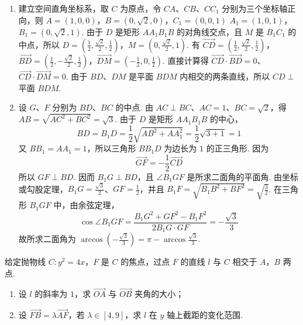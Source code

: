 \begin{solution}
\begin{enumerate}
\item 建立空间直角坐标系，取 \(C\) 为原点，令 \(CA\)、\(CB\)、\(CC_1\) 分别为三个坐标轴正向，则
\(A=(1,0,0)\)，\(B=(0,\sqrt2,0)\)，\(C_1=(0,0,1)\)
\(A_1=(1,0,1)\)，\(B_1=(0,\sqrt2,1)\).
由于 \(D\) 是矩形 \(AA_1B_1B\) 的对角线交点，且 \(M\) 是 \(B_1C_1\) 的中点，所以
\(D=\left(\frac12,\frac{\sqrt2}{2},\frac12\right)\)，\(M=\left(0,\frac{\sqrt2}{2},1\right)\).
有
\(\overrightarrow{CD}=\left(\frac12,\frac{\sqrt2}{2},\frac12\right)\)，\(\overrightarrow{BD}=\left(\frac12,-\frac{\sqrt2}{2},\frac12\right)\)，\(\overrightarrow{DM}=\left(-\frac12,0,\frac12\right)\).
直接计算得 \(\overrightarrow{CD}\cdot\overrightarrow{BD}=0\)、\(\overrightarrow{CD}\cdot\overrightarrow{DM}=0\). 由于 \(BD\)、\(DM\) 是平面 \(BDM\) 内相交的两条直线，所以 \(CD\perp\) 平面 \(BDM\).

\item 设 \(G\)、\(F\) 分别为 \(BD\)、\(BC\) 的中点. 由 \(AC\perp BC\)、\(AC=1\)、\(BC=\sqrt2\)，得
\(AB=\sqrt{AC^2+BC^2}=\sqrt3\). 由于 \(D\) 是矩形 \(AA_1B_1B\) 的中心，
\[
BD=B_1D=\frac12\sqrt{AB^2+AA_1^2}=\frac12\sqrt{3+1}=1
\]
又 \(BB_1=AA_1=1\)，所以三角形 \(BB_1D\) 为边长为 \(1\) 的正三角形. 因为
\[
\overrightarrow{GF}=-\frac12\overrightarrow{CD}
\]
所以 \(GF\perp BD\). 因而 \(B_1G\perp BD\)，且 \(\angle B_1GF\) 是所求二面角的平面角.
由坐标或勾股定理，\(B_1G=\frac{\sqrt3}{2}\)、\(GF=\frac12\)，并且 \(B_1F=\sqrt{B_1B^2+BF^2}=\sqrt{\frac32}\). 在三角形 \(B_1GF\) 中，由余弦定理，
\[
\cos\angle B_1GF=\frac{B_1G^2+GF^2-B_1F^2}{2B_1G\cdot GF}=-\frac{\sqrt3}{3}
\]
故所求二面角为 \(\arccos\left(-\frac{\sqrt3}{3}\right)=\pi-\arccos\frac{\sqrt3}{3}\).
\end{enumerate}
\end{solution}

\begin{problem}
给定抛物线 \(C: y^{2} = 4x\)，\(F\) 是 \(C\) 的焦点，过点 \(F\) 的直线 \(l\) 与 \(C\) 相交于 \(A\)，\(B\) 两点.

\begin{enumerate}
\item 设 \(l\) 的斜率为 \(1\)，求 \(\overrightarrow{OA}\) 与 \(\overrightarrow{OB}\) 夹角的大小；
\item 设 \(\overrightarrow{FB} = \lambda\overrightarrow{AF}\)，若 \(\lambda \in [4,9]\)，求 \(l\) 在 \(y\) 轴上截距的变化范围.
\end{enumerate}
\end{problem}

